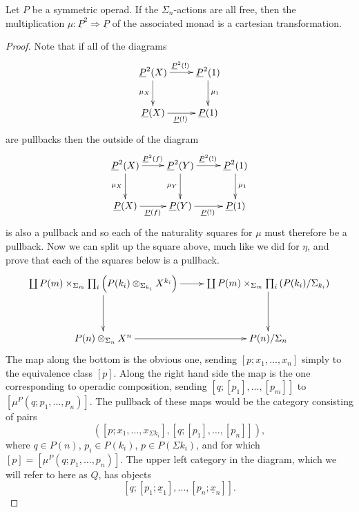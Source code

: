 \begin{prop}\label{prop:mu-2cart}
Let $P$ be a symmetric operad. If the $\Sigma_n$-actions are all free, then the multiplication $\mu \colon  \underline{P}^{2} \Rightarrow \underline{P}$ of the associated monad is a cartesian transformation.
\end{prop}
\begin{proof}
Note that if all of the diagrams
    \[
        \xy
            (0,0)*+{\underline{P}^2(X)}="00";
            (20,0)*+{\underline{P}^2(1)}="10";
            (0,-15)*+{\underline{P}(X)}="01";
            (20,-15)*+{\underline{P}(1)}="11";
            {\ar^{\underline{P}^2(!)} "00" ; "10"};
            {\ar^{\mu_1} "10" ; "11"};
            {\ar_{\mu_X} "00" ; "01"};
            {\ar_{\underline{P}(!)} "01" ; "11"};
        \endxy
    \]
are pullbacks then the outside of the diagram
    \[
        \xy
            (0,0)*+{\underline{P}^2(X)}="00";
            (20,0)*+{\underline{P}^2(Y)}="10";
            (40,0)*+{\underline{P}^2(1)}="20";
            (0,-15)*+{\underline{P}(X)}="01";
            (20,-15)*+{\underline{P}(Y)}="11";
            (40,-15)*+{\underline{P}(1)}="21";
            {\ar^{\underline{P}^2(f)} "00" ; "10"};
            {\ar^{\underline{P}^2(!)} "10" ; "20"};
            {\ar^{\mu_{1}} "20" ; "21"};
            {\ar_{\mu_X} "00" ; "01"};
            {\ar_{\underline{P}(f)} "01" ; "11"};
            {\ar_{\underline{P}(!)} "11" ; "21"};
            {\ar_{\mu_Y} "10" ; "11"};
        \endxy
    \]
is also a pullback and so each of the naturality squares for $\mu$ must therefore be a pullback. Now we can split up the square above, much like we did for $\eta$, and prove that each of the squares below is a pullback.
    \[
        \xy
            (0,0)*+{\coprod P(m) \times_{\Sigma_m} \prod_i \left(\coeqsig{P}{X}{{k_i}}\right)}="00";
            (60,0)*+{\coprod P(m) \times_{\Sigma_m} \prod_i \left(P(k_i) / \Sigma_{k_i}\right)}="10";
            (0,-20)*+{\coeqsig{P}{X}{n}}="01";
            (60,-20)*+{P(n) / \Sigma_{n}}="11";
            {\ar "00" ; "10"};
            {\ar "00" ; "01"};
            {\ar "01" ; "11"};
            {\ar "10" ; "11"};
        \endxy
    \]
The map along the bottom is the obvious one, sending $[p; x_1, \ldots, x_n]$ simply to the equivalence class $[p]$. Along the right hand side the map is the one corresponding to operadic composition, sending $[q;[p_1],\ldots,[p_m]]$ to $[\mu^P(q;p_1,\ldots,p_n)]$. The pullback of these maps would be the category consisting of pairs
    \[
        \left([p;x_1,\ldots,x_{\Sigma k_i}],[q;[p_1],\ldots,[p_n]]\right),
    \]
where $q \in P(n)$, $p_i \in P(k_i)$, $p \in P(\Sigma k_i)$, and for which $[p] = [\mu^P(q;p_1,\ldots,p_n)]$. The upper left category in the diagram, which we will refer to here as $Q$, has objects
    \[
        \left[q;\left[p_1;\underline{x}_1\right],\ldots,\left[p_n;\underline{x}_n\right]\right].
    \]


\end{proof}
